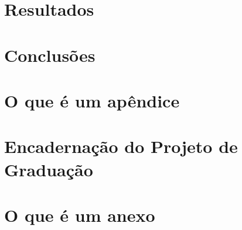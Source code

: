 \documentclass[a4paper,12pt,oneside,openany]{book}
\begin{document}
\chapter{Resultados}
\label{resultados}


\chapter{Conclusões}
\label{conclusao}


\normalsize
\cleardoublepage
{}



   \appendix
   \chapter{O que é um apêndice}
   \label{ApendiceA}
   
   \chapter{Encadernação do Projeto de Graduação}
   \label{ApendiceB}
   
   \chapter{O que é um anexo}
   \label{ApendiceC}
      

\backmatter
\end{document}
